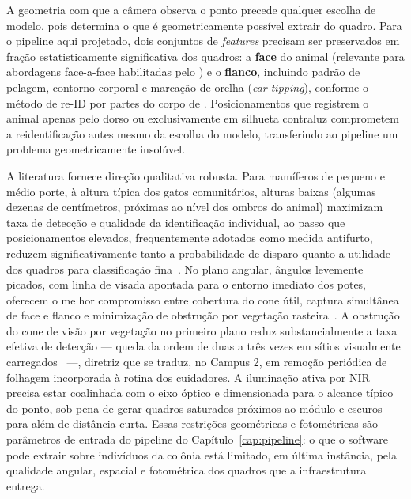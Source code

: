 A geometria com que a câmera observa o ponto precede qualquer escolha de modelo, pois determina o que é geometricamente possível extrair do quadro. Para o pipeline aqui projetado, dois conjuntos de \emph{features} precisam ser preservados em fração estatisticamente significativa dos quadros: a \textbf{face} do animal (relevante para abordagens face-a-face habilitadas pelo \modeloPetFace) e o \textbf{flanco}, incluindo padrão de pelagem, contorno corporal e marcação de orelha (\emph{ear-tipping}), conforme o método de re-ID por partes do corpo de . Posicionamentos que registrem o animal apenas pelo dorso ou exclusivamente em silhueta contraluz comprometem a reidentificação antes mesmo da escolha do modelo, transferindo ao pipeline um problema geometricamente insolúvel.

A literatura fornece direção qualitativa robusta. Para mamíferos de pequeno e médio porte, à altura típica dos gatos comunitários, alturas baixas (algumas dezenas de centímetros, próximas ao nível dos ombros do animal) maximizam taxa de detecção e qualidade da identificação individual, ao passo que posicionamentos elevados, frequentemente adotados como medida antifurto, reduzem significativamente tanto a probabilidade de disparo quanto a utilidade dos quadros para classificação fina~\cite{seidlitz2020height,beukes2025refining,meek2016higher}. No plano angular, ângulos levemente picados, com linha de visada apontada para o entorno imediato dos potes, oferecem o melhor compromisso entre cobertura do cone útil, captura simultânea de face e flanco e minimização de obstrução por vegetação rasteira~\cite{beukes2025refining,moll2020viewshed}. A obstrução do cone de visão por vegetação no primeiro plano reduz substancialmente a taxa efetiva de detecção --- queda da ordem de duas a três vezes em sítios visualmente carregados~\cite{moll2020viewshed} ---, diretriz que se traduz, no Campus 2, em remoção periódica de folhagem incorporada à rotina dos cuidadores. A iluminação ativa por NIR precisa estar coalinhada com o eixo óptico e dimensionada para o alcance típico do ponto, sob pena de gerar quadros saturados próximos ao módulo e escuros para além de distância curta. Essas restrições geométricas e fotométricas são parâmetros de entrada do pipeline do Capítulo~\ref{cap:pipeline}: o que o software pode extrair sobre indivíduos da colônia está limitado, em última instância, pela qualidade angular, espacial e fotométrica dos quadros que a infraestrutura entrega.
